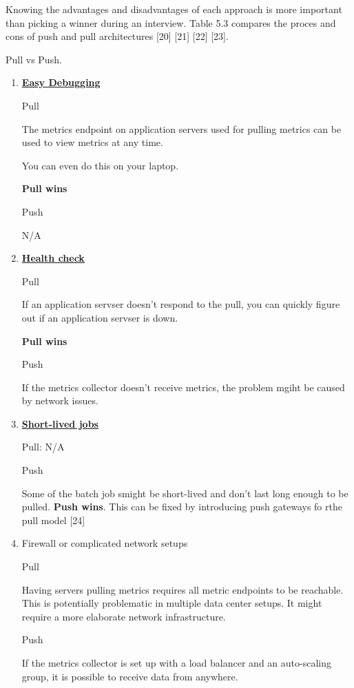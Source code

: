 \documentclass{report}
\theoremstyle{definition}
\begin{document}
Knowing the advantages and disadvantages of each approach is more important than picking a winner during an interview. Table 5.3 compares the proces and cons of push and pull architectures [20] [21] [22] [23].

Pull vs Push.

\begin{enumerate}
\item
\textbf{\underline{Easy Debugging}}

Pull

The metrics endpoint on application servers used for pulling
metrics can be used to view metrics at any time.

You can even do this on your laptop.

\textbf{Pull wins}

Push

N/A
\item

\textbf{\underline{Health check}}

Pull

If an application servser doesn't respond to the pull, you can quickly figure out if an application servser is down.

\textbf{Pull wins}

Push

If the metrics collector doesn't receive metrics, the problem mgiht be caused by network issues.

\item

\textbf{\underline{Short-lived jobs}}

Pull: N/A

Push

Some of the batch job smight be short-lived and don't last long enough to be pulled. \textbf{Push wins}. This can be fixed by introducing push gateways fo rthe pull model [24]

\item

Firewall or complicated network setups

Pull

Having servers pulling metrics requires all metric endpoints to be reachable. This is potentially problematic in multiple data center setups. It might require a more elaborate network infrastructure.


Push

If the metrics collector is set up with a load balancer and an auto-scaling group, it is possible to receive data from anywhere.


\end{enumerate}
\end{document}
